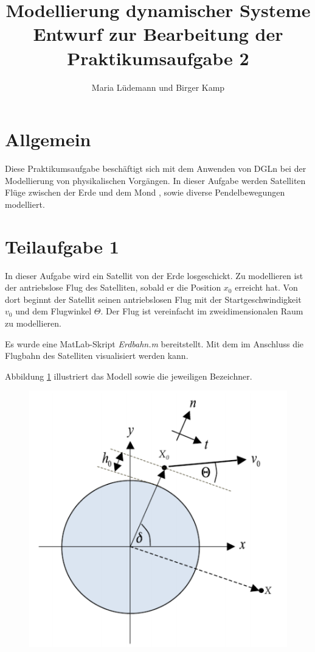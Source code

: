 \documentclass[]{scrartcl}
\title{Modellierung dynamischer Systeme  \\ Entwurf zur Bearbeitung der Praktikumsaufgabe 2}
\author{Maria Lüdemann und Birger Kamp}
\begin{document}
\maketitle

\begin{abstract}

\end{abstract}

\section{Allgemein}
Diese Praktikumsaufgabe beschäftigt sich mit dem Anwenden von DGLn bei der Modellierung von physikalischen Vorgängen. In dieser Aufgabe werden Satelliten Flüge zwischen der Erde und dem Mond , sowie diverse Pendelbewegungen modelliert.

\section{Teilaufgabe 1}
In dieser Aufgabe wird ein Satellit von der Erde losgeschickt. Zu modellieren ist der antriebslose Flug des Satelliten, sobald er die Position $x_{0}$ erreicht hat. Von dort beginnt der Satellit seinen antriebslosen Flug mit der Startgeschwindigkeit $v_{0}$ und dem Flugwinkel $\Theta$. Der Flug ist vereinfacht im zweidimensionalen Raum zu modellieren.

Es wurde eine MatLab-Skript \textit{Erdbahn.m} bereitstellt. Mit dem im Anschluss die Flugbahn des Satelliten visualisiert werden kann.

Abbildung \ref{fig:1_BezeichnerDiagramm} illustriert das Modell sowie die jeweiligen Bezeichner.
\begin{figure}[H]
\centering
\includegraphics[width=0.5\linewidth]{./1_BezeichnerDiagramm}
\caption{}
\label{fig:1_BezeichnerDiagramm}
\end{figure}
\end{document}
